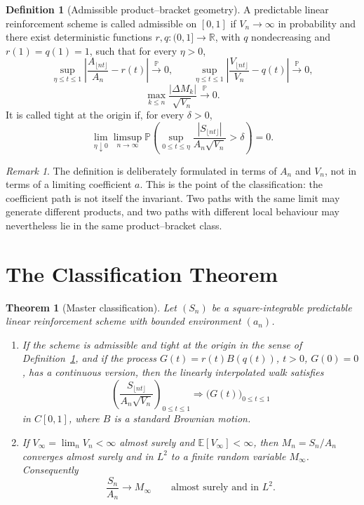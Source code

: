 \documentclass[11pt]{article}
\newtheorem{theorem}{Theorem}
\theoremstyle{definition}
\newtheorem{definition}{Definition}
\theoremstyle{remark}
\newtheorem{remark}{Remark}
\newcommand{\E}{\mathbb{E}}
\newcommand{\Pbb}{\mathbb{P}}
\newcommand{\R}{\mathbb{R}}
\newcommand{\1}{\mathbf{1}}
\begin{document}
\begin{definition}[Admissible product--bracket geometry]\label{def:admissible}
A predictable linear reinforcement scheme is called admissible on \([0,1]\) if
\(V_n\to\infty\)
in probability
and there exist deterministic functions \(r,q:(0,1]\to\R\), with \(q\)
nondecreasing and \(r(1)=q(1)=1\), such that for every \(\eta>0\),
\[
  \sup_{\eta\le t\le1}
  \left|\frac{A_{\lfloor nt\rfloor}}{A_n}-r(t)\right|
  \xrightarrow{\Pbb}0,
  \qquad
  \sup_{\eta\le t\le1}
  \left|\frac{V_{\lfloor nt\rfloor}}{V_n}-q(t)\right|
  \xrightarrow{\Pbb}0,
\]
\[
  \max_{k\le n}\frac{|\Delta M_k|}{\sqrt{V_n}}\xrightarrow{\Pbb}0.
\]
It is called tight at the origin if, for every \(\delta>0\),
\[
  \lim_{\eta\downarrow0}\limsup_{n\to\infty}
  \Pbb\left(
  \sup_{0\le t\le\eta}
  \frac{|S_{\lfloor nt\rfloor}|}{A_n\sqrt{V_n}}>\delta
  \right)=0.
\]
\end{definition}

\begin{remark}
The definition is deliberately formulated in terms of \(A_n\) and \(V_n\), not
in terms of a limiting coefficient \(a\). This is the point of the classification:
the coefficient path is not itself the invariant. Two paths with the same limit
may generate different products, and two paths with different local behaviour
may nevertheless lie in the same product--bracket class.
\end{remark}

\section{The Classification Theorem}\label{sec:classification}

\begin{theorem}[Master classification]\label{thm:classification}
Let \((S_n)\) be a square-integrable predictable linear reinforcement scheme
with bounded environment \((a_n)\).
\begin{enumerate}
  \item If the scheme is admissible and tight at the origin in the sense of
  Definition~\ref{def:admissible}, and if the process
  \(G(t)=r(t)B(q(t))\), \(t>0\), \(G(0)=0\), has a continuous version, then the
  linearly interpolated walk satisfies
  \[
    \left(\frac{S_{\lfloor nt\rfloor}}{A_n\sqrt{V_n}}\right)_{0\le t\le1}
    \Rightarrow
    \bigl(G(t)\bigr)_{0\le t\le1}
  \]
  in \(C[0,1]\), where \(B\) is a standard Brownian motion.
  \item If \(V_\infty=\lim_n V_n<\infty\) almost surely and
  \(\E[V_\infty]<\infty\), then
  \(M_n=S_n/A_n\) converges almost surely and in \(L^2\) to a finite random
  variable \(M_\infty\). Consequently
  \[
    \frac{S_n}{A_n}\longrightarrow M_\infty
    \qquad\text{almost surely and in }L^2.
  \]
\end{enumerate}
\end{theorem}
\end{document}
